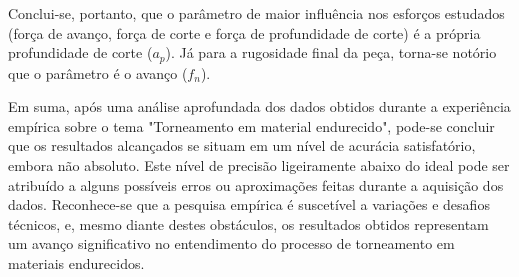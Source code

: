 \documentclass[deposito, acronym, symbols]{fei}
\begin{document}
Conclui-se, portanto, que o parâmetro de maior influência nos esforços estudados (força de avanço, força de corte e força de profundidade de corte) é a própria profundidade de corte ($a_p$). Já para a rugosidade final da peça, torna-se notório que o parâmetro é o avanço ($f_n$). 


Em suma, após uma análise aprofundada dos dados obtidos durante a experiência empírica sobre o tema "Torneamento em material endurecido", pode-se concluir que os resultados alcançados se situam em um nível de acurácia satisfatório, embora não absoluto. Este nível de precisão ligeiramente abaixo do ideal pode ser atribuído a alguns possíveis erros ou aproximações feitas durante a aquisição dos dados. Reconhece-se que a pesquisa empírica é suscetível a variações e desafios técnicos, e, mesmo diante destes obstáculos, os resultados obtidos representam um avanço significativo no entendimento do processo de torneamento em materiais endurecidos.


\printbibliography
\end{document}

